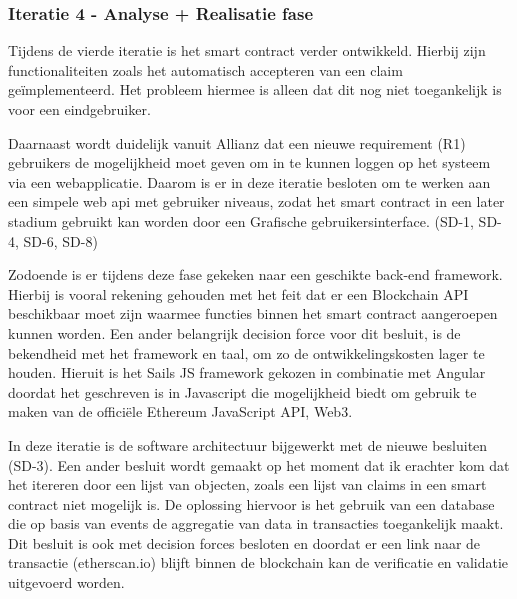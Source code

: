 \subsubsection{Iteratie 4 - Analyse + Realisatie fase}
Tijdens de vierde iteratie is het smart contract verder ontwikkeld. Hierbij zijn functionaliteiten zoals het automatisch accepteren van een claim geïmplementeerd. Het probleem hiermee is alleen dat dit nog niet toegankelijk is voor een eindgebruiker. \par

Daarnaast wordt duidelijk vanuit Allianz dat een nieuwe requirement (R1) gebruikers de mogelijkheid moet geven om in te kunnen loggen op het systeem via een webapplicatie. Daarom is er in deze iteratie besloten om te werken aan een simpele web api met gebruiker niveaus, zodat het smart contract in een later stadium gebruikt kan worden door een Grafische gebruikersinterface. (SD-1, SD-4, SD-6, SD-8)\par

Zodoende is er tijdens deze fase gekeken naar een geschikte back-end framework. Hierbij is vooral rekening gehouden met het feit dat er een Blockchain API beschikbaar moet zijn waarmee functies binnen het smart contract aangeroepen kunnen worden. Een ander belangrijk decision force voor dit besluit, is de bekendheid met het framework en taal, om zo de ontwikkelingskosten lager te houden. Hieruit is het Sails JS framework gekozen in combinatie met Angular doordat het geschreven is in Javascript die mogelijkheid biedt om gebruik te maken van de officiële Ethereum JavaScript API, Web3. \par

In deze iteratie is de software architectuur bijgewerkt met de nieuwe besluiten (SD-3). Een ander besluit wordt gemaakt op het moment dat ik erachter kom dat het itereren door een lijst van objecten, zoals een lijst van claims in een smart contract niet mogelijk is. De oplossing hiervoor is het gebruik van een database die op basis van events de aggregatie van data in transacties toegankelijk maakt. Dit besluit is ook met decision forces besloten en doordat er een link naar de transactie (etherscan.io) blijft binnen de blockchain kan de verificatie en validatie uitgevoerd worden.
